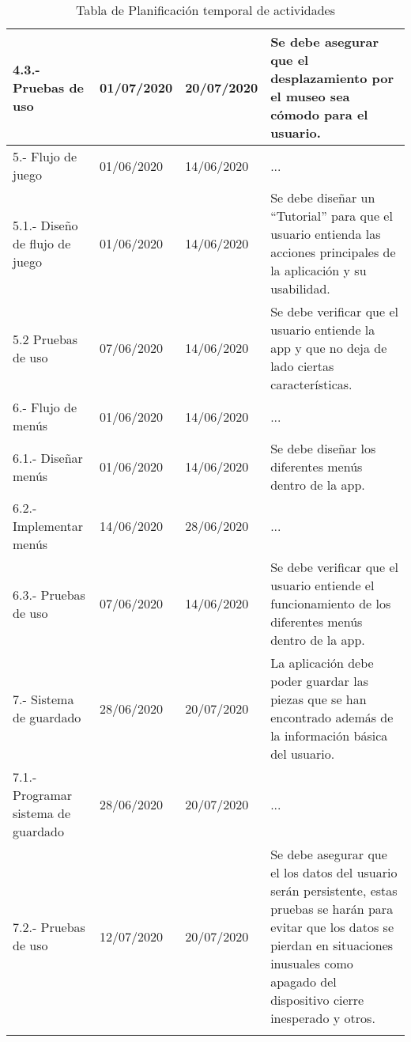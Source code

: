 \begin{longtable}{| p{}| p{}| p{}| p{}|}
\\
\hline 
	4.3.- Pruebas de uso &
	01/07/2020 &
	20/07/2020 &
	Se debe asegurar que el desplazamiento por el museo sea cómodo para el usuario.
\\
\hline 
	5.- Flujo de juego &
	01/06/2020 &
	14/06/2020 & 
	...
	\\
\hline 
	5.1.- Diseño de flujo de juego &
	01/06/2020 &
	14/06/2020 &
	Se debe diseñar un “Tutorial” para que el usuario entienda las acciones principales de la aplicación y su usabilidad.
\\
\hline 
	5.2 Pruebas de uso &
	07/06/2020 &
	14/06/2020 & 
	Se debe verificar que el usuario entiende la app y que no deja de lado ciertas características.
\\
\hline 
	6.- Flujo de menús &
	01/06/2020 &
	14/06/2020 &
	...
\\ 
\hline 
	6.1.- Diseñar menús &
	01/06/2020 &
	14/06/2020 &
	Se debe diseñar los diferentes menús dentro de la app.
\\
\hline 
	6.2.- Implementar menús &
	14/06/2020 &
	28/06/2020 &
	...
\\ 
\hline 
	6.3.- Pruebas de uso &
	07/06/2020 &
	14/06/2020 & 
	Se debe verificar que el usuario entiende el funcionamiento de los diferentes menús dentro de la app.
\\
\hline 
	7.- Sistema de guardado &
	28/06/2020 &
	20/07/2020 & 
	La aplicación debe poder guardar las piezas que se han encontrado además de la información básica del usuario.
\\ 
\hline 
	7.1.- Programar sistema de guardado &
	28/06/2020 &
	20/07/2020 & 
	...
\\ 
\hline 
	7.2.- Pruebas de uso &
	12/07/2020 &
	20/07/2020 &
	Se debe asegurar que el los datos del usuario serán persistente, estas pruebas se harán para evitar que los datos se pierdan en situaciones inusuales como apagado del dispositivo cierre inesperado y otros.
\\
\hline
\caption{Tabla de Planificación temporal de actividades}
\label{tab17}
\end{longtable} 

